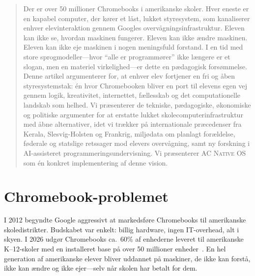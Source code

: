 \documentclass[11pt, a4paper]{article}
\newcommand{\acos}{\textsc{AC Native OS}}
\begin{document}
\begin{multicols}{2}


\begin{abstract}
\noindent
Der er over 50 millioner Chromebooks i amerikanske skoler. Hver eneste er en kapabel computer, der kører et låst, lukket styresystem, som kanaliserer enhver elevinteraktion gennem Googles overvågningsinfrastruktur. Eleven kan ikke se, hvordan maskinen fungerer. Eleven kan ikke ændre maskinen. Eleven kan ikke eje maskinen i nogen meningsfuld forstand. I en tid med store sprogmodeller---hvor ``alle er programmører'' ikke længere er et slogan, men en materiel virkelighed---er dette en pædagogisk forsømmelse. Denne artikel argumenterer for, at enhver elev fortjener en fri og åben styresystemstak: én hvor Chromebooken bliver en port til elevens egen vej gennem logik, kreativitet, internettet, fællesskab og det computationelle landskab som helhed. Vi præsenterer de tekniske, pædagogiske, økonomiske og politiske argumenter for at erstatte lukket skolecomputerinfrastruktur med åbne alternativer, idet vi trækker på internationale præcedenser fra Kerala, Slesvig-Holsten og Frankrig, miljødata om planlagt forældelse, føderale og statslige retssager mod elevers overvågning, samt ny forskning i AI-assisteret programmeringsundervisning. Vi præsenterer \acos{}~\citep{scudder2026acos} som én konkret implementering af denne vision.
\end{abstract}


\section{Chromebook-problemet}

I 2012 begyndte Google aggressivt at markedsføre Chromebooks til amerikanske skoledistrikter. Budskabet var enkelt: billig hardware, ingen IT-overhead, alt i skyen. I 2026 udgør Chromebooks ca.\ 60\% af enhederne leveret til amerikanske K--12-skoler med en installeret base på over 50 millioner enheder~\citep{google2024chromeos}. En hel generation af amerikanske elever bliver uddannet på maskiner, de ikke kan forstå, ikke kan ændre og ikke ejer---selv når skolen har betalt for dem.


\end{multicols}
\end{document}
